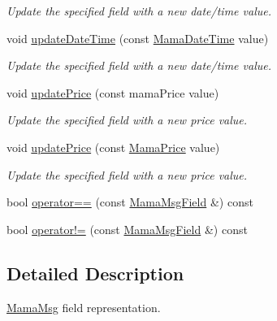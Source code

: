 \begin{DoxyCompactItemize}
$$\begin{DoxyCompactList}\small\item\em Update the specified field with a new date/time value. \item\end{DoxyCompactList}\item 
void \hyperlink{classWombat_1_1MamaMsgField_ab68bf6c821499d375e95db44eb5bb256}{updateDateTime} (const \hyperlink{classWombat_1_1MamaDateTime}{MamaDateTime} value)
\begin{DoxyCompactList}\small\item\em Update the specified field with a new date/time value. \item\end{DoxyCompactList}\item 
void \hyperlink{classWombat_1_1MamaMsgField_a25858892b10ed3f724a335bbd5b723de}{updatePrice} (const mamaPrice value)
\begin{DoxyCompactList}\small\item\em Update the specified field with a new price value. \item\end{DoxyCompactList}\item 
void \hyperlink{classWombat_1_1MamaMsgField_a1d8b0daa41c6ce10124701cd84fac3f6}{updatePrice} (const \hyperlink{classWombat_1_1MamaPrice}{MamaPrice} value)
\begin{DoxyCompactList}\small\item\em Update the specified field with a new price value. \item\end{DoxyCompactList}\item 
bool \hyperlink{classWombat_1_1MamaMsgField_a288819019e6d1fe09d42c5087e37ca00}{operator==} (const \hyperlink{classWombat_1_1MamaMsgField}{MamaMsgField} \&) const 
\item 
bool \hyperlink{classWombat_1_1MamaMsgField_a1945f91ef878e9392b836cbcbe192e14}{operator!=} (const \hyperlink{classWombat_1_1MamaMsgField}{MamaMsgField} \&) const 
\end{DoxyCompactItemize}


\subsection{Detailed Description}
\hyperlink{classWombat_1_1MamaMsg}{MamaMsg} field representation. 

